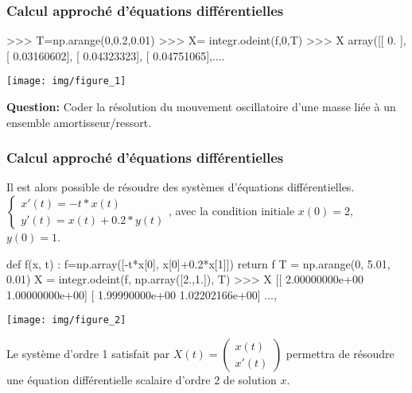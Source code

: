 \begin{frame}[fragile]
\frametitle{Calcul approché d'équations différentielles}

\begin{minipage}{0.4\linewidth}
\begin{GrayBox}[0.85\textwidth]
\begin{verbatimtab}[3]
>>> T=np.arange(0,0.2,0.01)
>>> X= integr.odeint(f,0,T)
>>> X
array([[ 0.        ],
       [ 0.03160602],
       [ 0.04323323],
       [ 0.04751065],....
\end{verbatimtab}
\end{GrayBox}
\end{minipage}\hfill
\begin{minipage}{0.5\linewidth}
 \texttt{[image: img/figure\_1]}
\end{minipage}

\textbf{Question: } Coder la résolution du mouvement oscillatoire d'une masse liée à un ensemble amortisseur/ressort. 

\vspace{3cm}
\end{frame}

\begin{frame}[fragile]
\frametitle{Calcul approché d'équations différentielles}

Il est alors possible de résoudre des systèmes d'équations différentielles.
$\left\{\begin{array}{l} x'(t)=-t*x(t) \\ y'(t)=x(t)+0.2*y(t)
\end{array}\right.$, avec la condition initiale $x(0) = 2$, $y(0) = 1$.

\begin{minipage}{0.6\linewidth}
\begin{GrayBox}[0.92\textwidth]
\begin{verbatimtab}[3]
def f(x, t) :
	f=np.array([-t*x[0], x[0]+0.2*x[1]])
	return f
T = np.arange(0, 5.01, 0.01)
X = integr.odeint(f, np.array([2.,1.]), T)
>>> X
[[  2.00000000e+00   1.00000000e+00]
 [  1.99990000e+00   1.02202166e+00]
 ..., 
\end{verbatimtab}
\end{GrayBox}
\end{minipage}\hfill
\begin{minipage}{0.35\linewidth}
 \texttt{[image: img/figure\_2]}
\end{minipage}

Le système d'ordre 1 satisfait par $X(t) = \left(\begin{array}{c}x(t) \\x'(t)\end{array}\right)$ permettra de résoudre une équation différentielle scalaire d'ordre 2 de solution $x$.

\end{frame}

